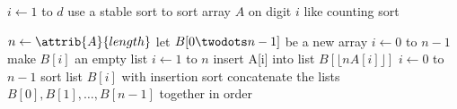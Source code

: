\documentclass[12pt]{article}
\begin{document}
\begin{codebox}
\li \For $i \gets 1$ to $d$
\li \Do
        use a stable sort to sort array $A$ on digit $i$ \Comment like counting sort
    \End
\end{codebox}

\begin{codebox}
\li $n \gets \attrib{A}{length}$
\li let $B[0 \twodots n-1]$ be a new array
\li \For $i \gets 0$ to $n-1$
\li     \Do
            make $B[i]$ an empty list
        \End
\li \For $i \gets 1$ to $n$
\li     \Do
            insert A[i] into list $B[\lfloor n A[i] \rfloor]$
        \End 
\li \For $i \gets 0$ to $n-1$
\li     \Do
            sort list $B[i]$ with insertion sort
        \End
\li concatenate the lists $B[0], B[1], \ldots, B[n-1]$ together in order
\end{codebox}
\end{document}
